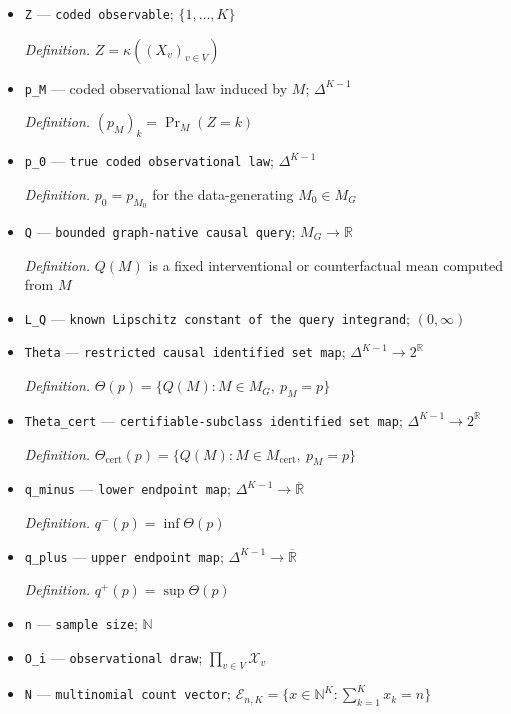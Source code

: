 \documentclass{article}
\begin{document}
\begin{itemize}
  \item \texttt{Z} --- \texttt{coded observable}; \(\{1,\ldots,K\}\)
  \par\smallskip\noindent\emph{Definition.} \(Z=\kappa((X_v)_{v\in V})\)
  \item \texttt{p\_\allowbreak{}M} --- coded observational law induced by \(M\); \(\Delta^{K-1}\)
  \par\smallskip\noindent\emph{Definition.} \((p_M)_k=\Pr_M(Z=k)\)
  \item \texttt{p\_\allowbreak{}0} --- \texttt{true coded observational law}; \(\Delta^{K-1}\)
  \par\smallskip\noindent\emph{Definition.} \(p_0=p_{M_0}\) for the data-generating \(M_0\in M_G\)
  \item \texttt{Q} --- \texttt{bounded graph-\allowbreak{}native causal query}; \(M_G\to\mathbb R\)
  \par\smallskip\noindent\emph{Definition.} \(Q(M)\) is a fixed interventional or counterfactual mean computed from \(M\)
  \item \texttt{L\_\allowbreak{}Q} --- \texttt{known Lipschitz constant of the query integrand}; \((0,\infty)\)
  \item \texttt{Theta} --- \texttt{restricted causal identified set map}; \(\Delta^{K-1}\to 2^{\mathbb R}\)
  \par\smallskip\noindent\emph{Definition.} \(\Theta(p)=\{Q(M):M\in M_G,\ p_M=p\}\)
  \item \texttt{Theta\_\allowbreak{}cert} --- \texttt{certifiable-\allowbreak{}subclass identified set map}; \(\Delta^{K-1}\to 2^{\mathbb R}\)
  \par\smallskip\noindent\emph{Definition.} \(\Theta_{\mathrm{cert}}(p)=\{Q(M):M\in M_{\mathrm{cert}},\ p_M=p\}\)
  \item \texttt{q\_\allowbreak{}minus} --- \texttt{lower endpoint map}; \(\Delta^{K-1}\to\overline{\mathbb R}\)
  \par\smallskip\noindent\emph{Definition.} \(q^-(p)=\inf\Theta(p)\)
  \item \texttt{q\_\allowbreak{}plus} --- \texttt{upper endpoint map}; \(\Delta^{K-1}\to\overline{\mathbb R}\)
  \par\smallskip\noindent\emph{Definition.} \(q^+(p)=\sup\Theta(p)\)
  \item \texttt{n} --- \texttt{sample size}; \(\mathbb N\)
  \item \texttt{O\_\allowbreak{}i} --- \texttt{observational draw}; \(\prod_{v\in V}\mathcal X_v\)
  \item \texttt{N} --- \texttt{multinomial count vector}; \(\mathcal E_{n,K}=\{x\in\mathbb N^K:\sum_{k=1}^Kx_k=n\}\)

\end{itemize}
\end{document}
